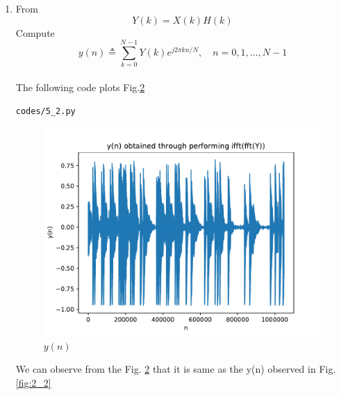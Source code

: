 \documentclass[journal,12pt,twocolumn]{IEEEtran}
\renewcommand\thesection{\arabic{section}}
\begin{document}
\begin{enumerate}[label=\thesection.\arabic*
,ref=\thesection.\theenumi]
\begin{figure}[!ht]
\caption{$X(k) and H(k)$}
\label{fig:5_1}
\end{figure}
\item From
\begin{equation}
Y(k) = X(k)H(k)
\end{equation}
Compute
\begin{equation}
y(n) \triangleq \sum_{k=0}^{N-1} Y(k) e^{j 2 \pi k n / N}, \quad n=0,1, \ldots, N-1
\end{equation}
\\
\solution
The following code plots Fig.\ref{fig:5_2}
\begin{lstlisting}
codes/5_2.py
\end{lstlisting}
\begin{figure}[!ht]
\centering
\includegraphics[width=\columnwidth]{./figs/5_2}
\caption{$y(n)$}
\label{fig:5_2}
\end{figure}
We can observe from the Fig. \ref{fig:5_2} that it is same as the y(n) observed in Fig.\ref{fig:2_2}
\end{enumerate}
\end{document}
